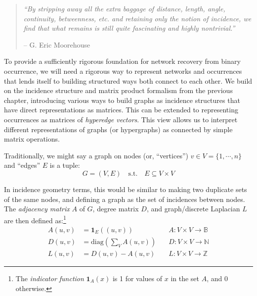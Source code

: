 \documentclass[%
	12pt,
		oneside,
		letterpaper
]{book}
\begin{document}
\begin{flushright}

\begin{minipage}{.7\linewidth}

\singlespacing

\begin{quote}
\emph{``By stripping away all the extra baggage of distance, length, angle, continuity, betweenness, etc. and retaining only the notion of incidence, we find that what remains is still quite fascinating and highly nontrivial.''}

\hfill -- G. Eric Moorehouse\\
\doublespacing 
\end{quote}

\end{minipage}

\end{flushright}

To provide a sufficiently rigorous foundation for network recovery from binary occurrence, we will need a rigorous way to represent networks and occurrences that lends itself to building structured ways both connect to each other.
We build on the incidence structure and matrix product formalism from the previous chapter, introducing various ways to build graphs as incidence structures that have direct representations as matrices.
This can be extended to representing occurrences as matrices of \emph{hyperedge vectors}.
This view allows us to interpret different representations of graphs (or hypergraphs) as connected by simple matrix operations.

Traditionally\autocite{MathematicalfoundationsGraphBLAS_Kepner2016,WhyHowWhen_Torres2021}, we might say a graph on nodes (or, ``vertices'') \(v\in V=\{1,\cdots,n\}\) and ``edges'' \(E\) is a tuple:
\[
G=(V,E) \quad \textrm{s.t.} \quad E\subseteq V \times V
\]

In incidence geometry terms, this would be similar to making two duplicate sets of the same nodes, and defining a graph as the set of incidences between nodes.
The \emph{adjacency matrix} \(A\) of \(G\), degree matrix \(D\), and graph/discrete Laplacian \(L\) are then defined as:\footnote{
  The \emph{indicator function} \(\mathbf{1}_A(x)\) is 1 for values of \(x\) in the set \(A\), and 0 otherwise.}
\[
\begin{aligned}
A(u,v) & =\mathbf{1}_E((u,v)) \quad &A : V\times V\rightarrow \mathbb{B} \\
D(u,v) & =\mathrm{diag}({\textstyle\sum}_V A(u,v))\quad &D : V\times V\rightarrow \mathbb{N} \\
L(u,v) & = D(u,v) - A(u,v) \quad &L : V\times V\rightarrow \mathbb{Z} 
\end{aligned}
\]
\end{document}
